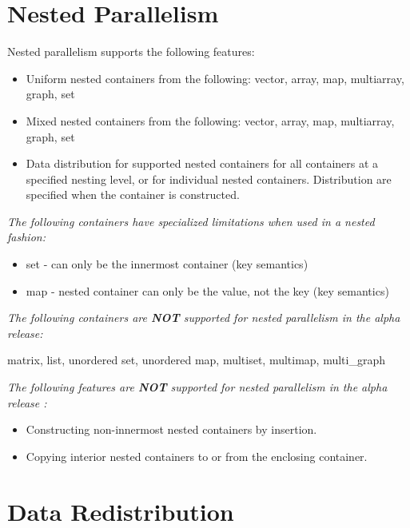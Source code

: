 \documentclass{report}
\begin{document}

\section{Nested Parallelism}

Nested parallelism supports the following features:

\begin{itemize}
\item
Uniform nested containers from the following:
vector, array, map, multiarray, graph, set
\item
Mixed nested containers from the following:
vector, array, map, multiarray, graph, set
\item
Data distribution for supported nested containers for all containers
at a specified nesting level, or for individual nested containers.
Distribution are specified when the container is constructed.
\end{itemize}

\noindent
\textit{ The following containers have specialized limitations when used in a nested fashion:}
\begin{itemize}
\item
set - can only be the innermost container (key semantics)
\item
map - nested container can only be the value, not the key (key semantics)
\end{itemize}

\noindent
\textit{ The following containers are {\bf NOT} supported for
nested parallelism in the alpha release: }

\noindent
matrix, list, 
unordered set, unordered map, multiset, multimap, multi\_graph

\noindent
\textit{ The following features are {\bf NOT} supported for
nested parallelism in the alpha release : }

\begin{itemize}
\item
Constructing non-innermost nested containers by insertion.
\item
Copying interior nested containers to or from the enclosing container.
\end{itemize}


\section{Data Redistribution}
\end{document}
